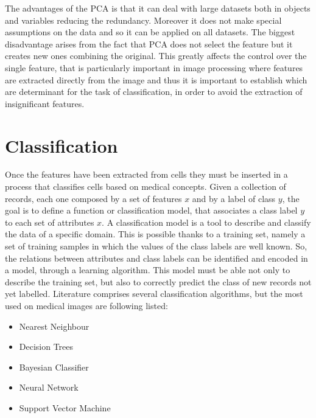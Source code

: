 \documentclass[final,a4paper,12pt,english]{UnicaPhdThesis3}
\begin{document}
	The advantages of the PCA is that it can deal with large datasets both in objects and variables reducing the redundancy. Moreover it does not make special assumptions on the data and so it can be applied on all datasets. The biggest disadvantage arises from the fact that PCA does not select the feature but it creates new ones combining the original. This greatly affects the control over the single feature, that is particularly important in image processing where features are extracted directly from the image and thus it is important to establish which are determinant for the task of classification, in order to avoid the extraction of insignificant features.  
	
	\chapter{Classification}
	Once the features have been extracted from cells they must be inserted in a process that classifies cells based on medical concepts. Given a collection of records, each one composed by a set of features $x$ and by a label of class $y$, the goal is to define a function or classification model, that associates a class label $y$ to each set of attributes $x$. A classification model is a tool to describe and classify the data of a specific domain. This is possible thanks to a training set, namely a set of training samples in which the values ​​of the class labels are well known. So, the relations between attributes and class labels can be identified and encoded in a model, through a learning algorithm. This model must be able not only to describe the training set, but also to correctly predict the class of new records not yet labelled. Literature comprises several classification algorithms, but the most used on medical images are following listed:
	\begin{itemize}
		\item Nearest Neighbour
		\item Decision Trees
		\item Bayesian Classifier	
		\item Neural Network
		\item Support Vector Machine
	\end{itemize}
	
\end{document}
